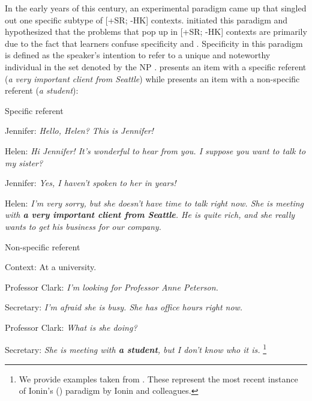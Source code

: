 \documentclass[output=paper,
modfonts
]{langscibook}
\begin{document}
In the early years of this century, an experimental paradigm came up that singled out one specific subtype of [+SR; -HK] contexts. \citet{Ionin2003} initiated this paradigm and hypothesized that the problems that pop up in [+SR; -HK] contexts are primarily due to the fact that learners confuse specificity and . Specificity in this paradigm is defined as the speaker’s intention to refer to a unique and noteworthy individual in the set denoted by the NP \citep{IoninKoWexler2004}.  presents an item with a specific referent (\textit{a very important client from Seattle}) while  presents an item with a non-specific referent (\textit{a student}):

\ea\label{ex:lebruyn:1} {Specific referent}

Jennifer: \textit{Hello, Helen? This is Jennifer!}

Helen: \textit{Hi Jennifer! It’s wonderful to hear from you. I suppose you want to talk to my sister?}

Jennifer: \textit{Yes, I haven’t spoken to her in years!}

Helen: \textit{I’m very sorry, but she doesn’t have time to talk right now. She is meeting with \textbf{a very important client from Seattle}. He is quite rich, and she really wants to get his business for our company.} \citep{KoIoninWexler2010}
\z

\ea\label{ex:lebruyn:2} {Non-specific referent}

Context: At a university.

Professor Clark: \textit{I’m looking for Professor Anne Peterson.}

Secretary: \textit{I’m afraid she is busy. She has office hours right now.}

Professor Clark: \textit{What is she doing?}

Secretary: \textit{She is meeting with \textbf{a student}, but I don’t know who it is.} \citep{KoIoninWexler2010}\footnote{We provide examples taken from \citet{KoIoninWexler2010}. These represent the most recent instance of Ionin’s (\citeyear{Ionin2003}) paradigm by Ionin and colleagues.} 
\z
\end{document}
